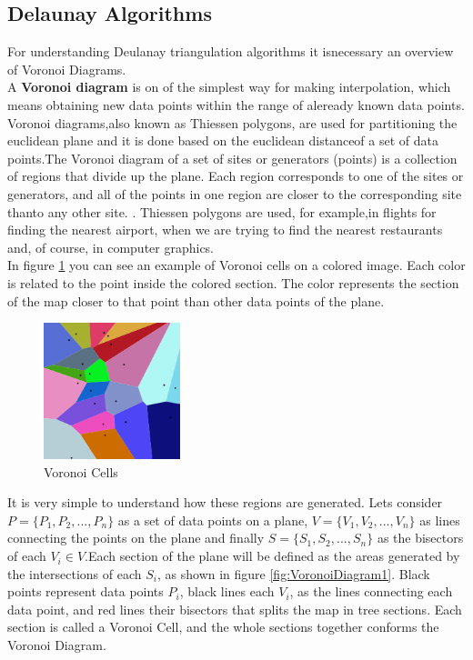 \documentclass[conference]{IEEEtran}
\begin{document}
\subsection{Delaunay Algorithms}
For  understanding  Deulanay  triangulation  algorithms  it  isnecessary an overview of Voronoi Diagrams.\\
A \textbf{ Voronoi diagram} is  on  of  the  simplest  way  for  making interpolation,  which  means  obtaining  new  data  points  within the  range  of  aleready  known  data  points.  Voronoi  diagrams,also known as Thiessen polygons, are used for partitioning the euclidean plane and it is done based on the euclidean distanceof a set of data points.The Voronoi diagram of a set of sites or generators (points) is a  collection  of  regions  that  divide  up  the  plane.  Each  region corresponds  to  one  of  the  sites  or  generators,  and  all  of  the points in one region are closer to the corresponding site thanto any other site. \cite{VoronoiD}. Thiessen polygons are used, for example,in  flights  for  finding  the  nearest  airport,  when  we  are  trying to  find  the  nearest  restaurants  and,  of  course,  in  computer graphics.\\In  figure  \ref{fig:VoronoiColored} you  can  see  an  example  of  Voronoi  cells  on  a colored  image.  Each  color  is  related  to  the  point  inside  the colored  section.  The  color  represents  the  section  of  the  map closer to that point than other data points of the plane.

\begin{figure}[H]
    \centering
    \includegraphics[width=150,height=150,keepaspectratio]{VoronoiColors.png}
    \caption{Voronoi Cells}
    \label{fig:VoronoiColored}
\end{figure}
    
It is very simple to understand how these regions are generated. Lets consider $P=\{P_1,P_2,...,P_n\}$ as a set of data points on a plane, $V={\{V_1,V_2,...,V_n\}}$ as lines connecting the points on the plane and finally $S={\{S_1,S_2,...,S_n\}}$ as the bisectors of each $V_i \in V$.Each section of the plane will be defined as the areas generated by the intersections of each $S_i$, as shown in figure \ref{fig:VoronoiDiagram1}. Black points represent data points $P_i$, black lines each $V_i$, as the lines connecting each data point, and red lines their bisectors that splits the map in tree sections. Each section is called a Voronoi Cell, and the whole sections together conforms the Voronoi Diagram.
\end{document}
